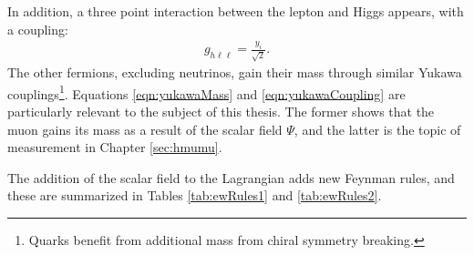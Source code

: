 In addition, a three point interaction between the lepton and Higgs appears, with a coupling:
\begin{equation}\begin{split}\label{eqn:yukawaCoupling}
    g_{h\ell\ell}=\frac{y_i}{\sqrt{2}}.
\end{split}\end{equation} 
The other fermions, excluding neutrinos, gain their mass through similar Yukawa couplings\footnote{Quarks benefit from additional mass from chiral symmetry breaking.}.
Equations \ref{eqn:yukawaMass} and \ref{eqn:yukawaCoupling} are particularly relevant to the subject of this thesis.
The former shows that the muon gains its mass as a result of the scalar field $\Psi$, and the latter is the topic of measurement in Chapter \ref{sec:hmumu}.

The addition of the scalar field to the Lagrangian adds new Feynman rules, and these are summarized in Tables \ref{tab:ewRules1} and \ref{tab:ewRules2}.

